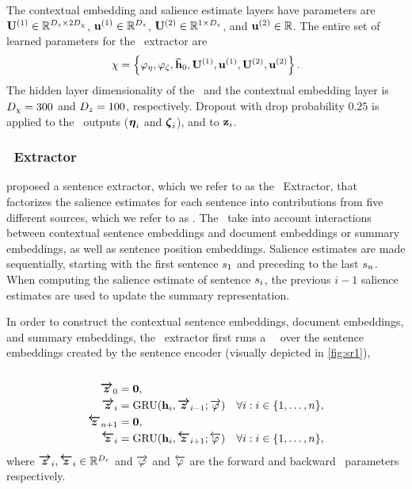 The contextual embedding and salience estimate layers have parameters are
$\mathbf{U}^{(1)} \in \mathbb{R}^{{D_{z}} \times 2 {D_{\chi}}}$, $\mathbf{u}^{(1)}
\in \mathbb{R}^{{D_{z}}}$, $\mathbf{U}^{(2)} \in \mathbb{R}^{1 \times {D_{z}}}$,
and $\mathbf{u}^{(2)}\in \mathbb{R}$.  The entire set of learned parameters for the
\clext~extractor are
\[
    \chi = \left\{ 
    \varphi_\eta, \varphi_\zeta,
    \boldsymbol{\bar{\mathbf{h}}}_0,
    \mathbf{U}^{(1)}, \mathbf{u}^{(1)}, \mathbf{U}^{(2)}, \mathbf{u}^{(2)}\right\}.
\]
The hidden layer dimensionality of the \gru~and the contextual embedding layer
is ${D_{\chi}} = 300$ and ${D_{z}}=100$, respectively.  Dropout with drop
probability $0.25$ is applied to the \gru~outputs ($\boldsymbol{\eta}_i$ and
$\boldsymbol{\zeta}_i$),   and to $\mathbf{z}_i$.

\subsubsection{\srext~Extractor}

\citet{nallapati2017summarunner} proposed a sentence extractor, which we refer
to as the \srext~Extractor, that factorizes the salience estimates for each
sentence into contributions from five different sources, which we refer to as
\saliencefactors.  The \saliencefactors~take into account interactions between
contextual sentence embeddings and document embeddings or summary embeddings,
as well as sentence position embeddings. Salience estimates are made
sequentially, starting with the first sentence $s_1$ and preceding to the
last $s_n$. When computing the salience estimate of sentence
$s_i$, the previous $i-1$ salience estimates are used to update the summary
representation.

In order to construct the contextual sentence embeddings, document embeddings,
and summary embeddings, the \srext~extractor first runs a
\bidirectional~\gru~over the sentence embeddings created by the sentence
encoder (visually depicted in \autoref{fig:sr1}),\\



\\[-40pt]
\begin{align}
    \boldsymbol{\overrightarrow{z}}_0 &= \mathbf{0}, \\
    \boldsymbol{\overrightarrow{z}}_i &= \operatorname{GRU}(\mathbf{h}_i, \boldsymbol{\overrightarrow{z}}_{i-1}; \overrightarrow{\varphi}) &
    \forall i : i \in \{1,\ldots,n\},\\
    \boldsymbol{\overleftarrow{z}}_{n + 1} &= \mathbf{0},\\
    \boldsymbol{\overleftarrow{z}}_i &= \operatorname{GRU}(\mathbf{h}_i, \boldsymbol{\overleftarrow{z}}_{i+1}; \overleftarrow{\varphi})
    & \forall i : i \in \{1,\ldots,n\},
\end{align}
where $\boldsymbol{\overrightarrow{z}}_i,\boldsymbol{\overleftarrow{z}}_i \in \mathbb{R}^{{D_r}}$ and $\overrightarrow{\varphi}$ and
$\overleftarrow{\varphi}$ are the forward and backward \gru~parameters respectively.

